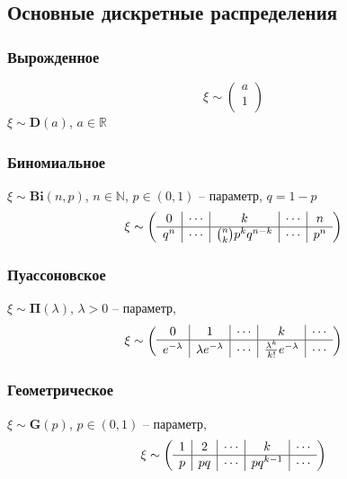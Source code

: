 \subsection{Основные дискретные распределения}
\subsubsection{Вырожденное}
\[ \xi \sim \left( \begin{array}{c}
	a \\ \hline
	1 \\
\end{array} \right) \]
$\xi \sim \boldsymbol{D}(a)$, $a \in \mathbb{R}$
\subsubsection{Биномиальное}
$\xi \sim \boldsymbol{Bi}(n,p)$, $n \in \mathbb{N}$, $p \in (0,1)$ -- параметр, $q=1-p$
\[ \xi \sim \left( \begin{array}{ccccc}
	0 & \multicolumn{1}{|c}{\cdots} & \multicolumn{1}{|c}{k} & \multicolumn{1}{|c}{\cdots} & \multicolumn{1}{|c}{n}\\ \hline
	q^{n} & \multicolumn{1}{|c}{\cdots} & \multicolumn{1}{|c}{\binom{n}{k}p^{k}q^{n-k}} & \multicolumn{1}{|c}{\cdots} & \multicolumn{1}{|c}{p^{n}}\\
\end{array} \right) \]
\subsubsection{Пуассоновское}
$\xi \sim \boldsymbol{\Pi}(\lambda)$, $\lambda > 0$ -- параметр,
\[ \xi \sim \left( \begin{array}{ccccc}
	0 & \multicolumn{1}{|c}{1} & \multicolumn{1}{|c}{\cdots} & \multicolumn{1}{|c}{k} & \multicolumn{1}{|c}{\cdots}\\ \hline
	e^{-\lambda} & \multicolumn{1}{|c}{\lambda e^{-\lambda}} & \multicolumn{1}{|c}{\cdots} & \multicolumn{1}{|c}{\frac{\lambda^{k}}{k!} e^{-\lambda}} & \multicolumn{1}{|c}{\cdots}\\
\end{array} \right) \]
\subsubsection{Геометрическое}
$\xi \sim \boldsymbol{G}(p)$, $p \in (0,1)$ -- параметр,
\[ \xi \sim \left( \begin{array}{ccccc}
	1 & \multicolumn{1}{|c}{2} & \multicolumn{1}{|c}{\cdots} & \multicolumn{1}{|c}{k} & \multicolumn{1}{|c}{\cdots}\\ \hline
	p & \multicolumn{1}{|c}{pq} & \multicolumn{1}{|c}{\cdots} & \multicolumn{1}{|c}{pq^{k-1}} & \multicolumn{1}{|c}{\cdots}\\
\end{array} \right) \]
